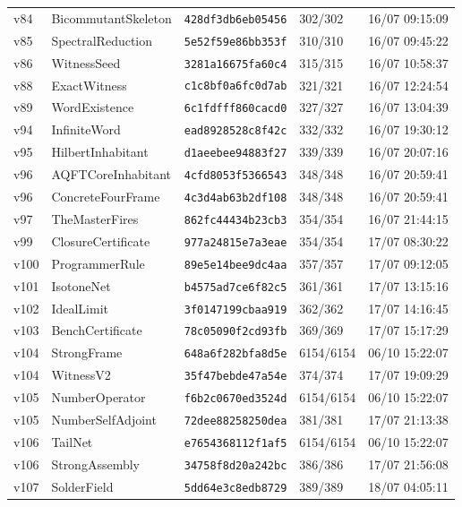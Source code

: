 \documentclass[11pt]{article}
\theoremstyle{definition}\newtheorem{deriv}{Derivação}
\begin{document}
{\begin{longtable}{@{}lllll@{}}
v84 & BicommutantSkeleton & \texttt{428df3db6eb05456} & 302/302 & 16/07 09:15:09 \\
v85 & SpectralReduction & \texttt{5e52f59e86bb353f} & 310/310 & 16/07 09:45:22 \\
v86 & WitnessSeed & \texttt{3281a16675fa60c4} & 315/315 & 16/07 10:58:37 \\
v88 & ExactWitness & \texttt{c1c8bf0a6fc0d7ab} & 321/321 & 16/07 12:24:54 \\
v89 & WordExistence & \texttt{6c1fdfff860cacd0} & 327/327 & 16/07 13:04:39 \\
v94 & InfiniteWord & \texttt{ead8928528c8f42c} & 332/332 & 16/07 19:30:12 \\
v95 & HilbertInhabitant & \texttt{d1aeebee94883f27} & 339/339 & 16/07 20:07:16 \\
v96 & AQFTCoreInhabitant & \texttt{4cfd8053f5366543} & 348/348 & 16/07 20:59:41 \\
v96 & ConcreteFourFrame & \texttt{4c3d4ab63b2df108} & 348/348 & 16/07 20:59:41 \\
v97 & TheMasterFires & \texttt{862fc44434b23cb3} & 354/354 & 16/07 21:44:15 \\
v99 & ClosureCertificate & \texttt{977a24815e7a3eae} & 354/354 & 17/07 08:30:22 \\
v100 & ProgrammerRule & \texttt{89e5e14bee9dc4aa} & 357/357 & 17/07 09:12:05 \\
v101 & IsotoneNet & \texttt{b4575ad7ce6f82c5} & 361/361 & 17/07 13:15:16 \\
v102 & IdealLimit & \texttt{3f0147199cbaa919} & 362/362 & 17/07 14:16:45 \\
v103 & BenchCertificate & \texttt{78c05090f2cd93fb} & 369/369 & 17/07 15:17:29 \\
v104 & StrongFrame & \texttt{648a6f282bfa8d5e} & 6154/6154 & 06/10 15:22:07 \\
v104 & WitnessV2 & \texttt{35f47bebde47a54e} & 374/374 & 17/07 19:09:29 \\
v105 & NumberOperator & \texttt{f6b2c0670ed3524d} & 6154/6154 & 06/10 15:22:07 \\
v105 & NumberSelfAdjoint & \texttt{72dee88258250dea} & 381/381 & 17/07 21:13:38 \\
v106 & TailNet & \texttt{e7654368112f1af5} & 6154/6154 & 06/10 15:22:07 \\
v106 & StrongAssembly & \texttt{34758f8d20a242bc} & 386/386 & 17/07 21:56:08 \\
v107 & SolderField & \texttt{5dd64e3c8edb8729} & 389/389 & 18/07 04:05:11 \\

\end{longtable}}
\end{document}
